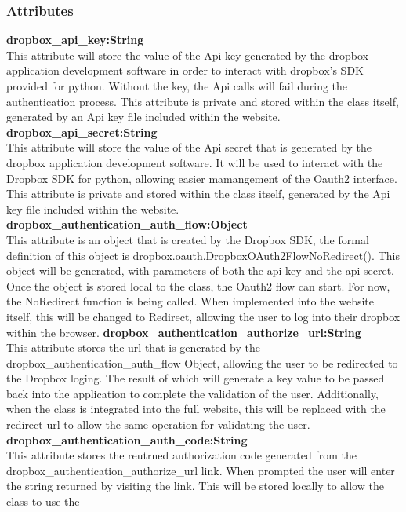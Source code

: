 \subsubsection{Attributes}
\textbf{dropbox\_api\_key:String} \\
    This attribute will store the value of the Api key generated by the dropbox application development software 
    in order to interact with dropbox's SDK provided for python. Without the key, the Api calls will fail during 
    the authentication process. This attribute is private and stored within the class itself, generated by an Api
    key file included within the website.
\textbf{dropbox\_api\_secret:String} \\
    This attribute will store the value of the Api secret that is generated by the dropbox application development
    software. It will be used to interact with the Dropbox SDK for python, allowing easier mamangement of the Oauth2
    interface. This attribute is private and stored within the class itself, generated by the Api key file included 
    within the website.
\textbf{dropbox\_authentication\_auth\_flow:Object} \\
    This attribute is an object that is created by the Dropbox SDK, the formal definition of this object is 
    dropbox.oauth.DropboxOAuth2FlowNoRedirect(). This object will be generated, with parameters of both the api key
    and the api secret. Once the object is stored local to the class, the Oauth2 flow can start. For now, the NoRedirect
    function is being called. When implemented into the website itself, this will be changed to Redirect, allowing the 
    user to log into their dropbox within the browser. 
\textbf{dropbox\_authentication\_authorize\_url:String} \\
    This attribute stores the url that is generated by the dropbox\_authentication\_auth\_flow Object, allowing the user
    to be redirected to the Dropbox loging. The result of which will generate a key value to be passed back into the application
    to complete the validation of the user. Additionally, when the class is integrated into the full website, this will be replaced
    with the redirect url to allow the same operation for validating the user.
\textbf{dropbox\_authentication\_auth\_code:String} \\
    This attribute stores the reutrned authorization code generated from the dropbox\_authentication\_authorize\_url link. When
    prompted the user will enter the string returned by visiting the link. This will be stored locally to allow the class to use the
